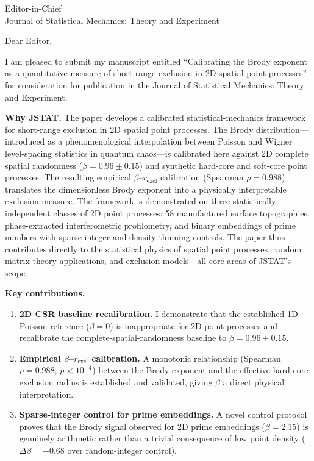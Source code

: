 \documentclass{letter}
\date{\today}
\begin{document}
\begin{letter}{Editor-in-Chief \\
Journal of Statistical Mechanics: Theory and Experiment}

\opening{Dear Editor,}

I am pleased to submit my manuscript entitled ``Calibrating the Brody exponent
as a quantitative measure of short-range exclusion in 2D spatial point
processes'' for consideration for publication in the Journal of Statistical
Mechanics: Theory and Experiment.

\textbf{Why JSTAT.} The paper develops a calibrated statistical-mechanics
framework for short-range exclusion in 2D spatial point processes. The Brody
distribution---introduced as a phenomenological interpolation between Poisson
and Wigner level-spacing statistics in quantum chaos---is calibrated here
against 2D complete spatial randomness ($\beta=0.96\pm0.15$) and synthetic
hard-core and soft-core point processes. The resulting empirical
$\beta$--$r_{\text{excl}}$ calibration (Spearman $\rho=0.988$) translates
the dimensionless Brody exponent into a physically interpretable exclusion
measure. The framework is demonstrated on three statistically independent
classes of 2D point processes: 58 manufactured surface topographies,
phase-extracted interferometric profilometry, and binary embeddings of
prime numbers with sparse-integer and density-thinning controls. The paper
thus contributes directly to the statistical physics of spatial point
processes, random matrix theory applications, and exclusion models---all
core areas of JSTAT's scope.

\textbf{Key contributions.}
\begin{enumerate}
  \item \textbf{2D CSR baseline recalibration.} I demonstrate that the
  established 1D Poisson reference ($\beta=0$) is inappropriate for 2D
  point processes and recalibrate the complete-spatial-randomness baseline
  to $\beta=0.96\pm0.15$.

  \item \textbf{Empirical $\beta$--$r_{\text{excl}}$ calibration.} A monotonic
  relationship (Spearman $\rho=0.988$, $p<10^{-4}$) between the Brody exponent
  and the effective hard-core exclusion radius is established and validated,
  giving $\beta$ a direct physical interpretation.

  \item \textbf{Sparse-integer control for prime embeddings.} A novel control
  protocol proves that the Brody signal observed for 2D prime embeddings
  ($\beta=2.15$) is genuinely arithmetic rather than a trivial consequence
  of low point density ($\Delta\beta=+0.68$ over random-integer control).


\end{enumerate}
\end{letter}
\end{document}
